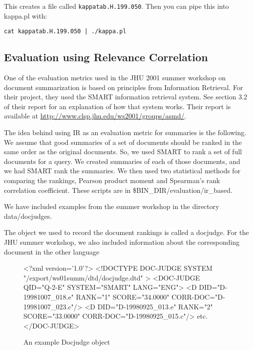 \documentclass[10pt]{article}
\begin{document}
This creates a file called {\tt kappatab.H.199.050}.  Then you can pipe this into 
kappa.pl with:

\begin{verbatim}
cat kappatab.H.199.050 | ./kappa.pl
\end{verbatim}  

\subsection{Evaluation using Relevance Correlation}
One of the evaluation metrics used in the JHU 2001 summer workshop on 
document summarization is based on principles from Information Retrieval.  
For their project, they used the SMART information retrieval system.  See 
section 3.2 of their report for an explanation of how that system works.
Their report is available at \url{http://www.clsp.jhu.edu/ws2001/groups/asmd/}.

The idea behind using IR as an evaluation metric for summaries is the
following.  We assume that good summaries of a set of documents should be
ranked in the same order as the original documents.  So, we used SMART to
rank a set of full documents for a query.  We created summaries of each of
those documents, and we had SMART rank the summaries.  We then used two
statistical methods for comparing the rankings, Pearson product moment and
Spearman's rank correlation coefficient.  These scripts are in 
\$BIN\_DIR/evaluation/ir\_based.  

We have included examples from the summer workshop in the 
directory data/docjudges.


The object we used to record the document rankings is called a docjudge.
For the JHU summer workshop, we also included information
about the corresponding document in the other language

\begin{figure}[htp!]
\centering 
{\small
\begin{boxedverbatim}
<?xml version='1.0'?>
<!DOCTYPE DOC-JUDGE SYSTEM "/export/ws01summ/dtd/docjudge.dtd" >
<DOC-JUDGE QID="Q-2-E" SYSTEM="SMART" LANG="ENG">
<D DID="D-19981007\_018.e" RANK="1" SCORE="34.0000" CORR-DOC="D-19981007\_023.c"/>
<D DID="D-19980925\_013.e" RANK="2" SCORE="33.0000" CORR-DOC="D-19980925\_015.c"/>
etc.
</DOC-JUDGE>
\end{boxedverbatim}
}%
\caption{An example Docjudge object}
\label{figure:docjudge}

\end{figure}
\end{document}
